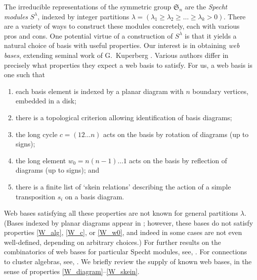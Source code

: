\documentclass[ALCO, Unicode]{cedram}
\numberwithin{equation}{section}
\begin{document}
The irreducible representations of the symmetric group $\mathfrak{S}_n$ are the \emph{Specht modules} $S^\lambda$, indexed by integer partitions $\lambda = (\lambda_1 \geq \lambda_2 \geq \dots \geq \lambda_k > 0)$. There are a variety of ways to construct these modules concretely, each with various pros and cons. One potential virtue of a construction of $S^\lambda$ is that it yields a natural choice of basis with useful properties. Our interest is in obtaining \emph{web bases}, extending seminal work of G.~Kuperberg \cite{Kuperberg}. Various authors differ in precisely what properties they expect a web basis to satisfy. For us, a web basis is one such that 
\begin{enumerate}[label=\textrm{(W.\arabic*)}]
    \item each basis element is indexed by a planar diagram with $n$ boundary vertices, embedded in a disk;\label{W_diagram}
    \item there is a topological criterion allowing identification of basis diagrams; \label{W_alg}
    \item the long cycle $c = (12\ldots n)$ acts on the basis by rotation of diagrams (up to signs); \label{W_c}
    \item \label{W_w0} the long element $w_0 = n(n-1) \ldots 1$ acts on the basis by reflection of diagrams (up to signs); and 
    \item there is a finite list of `skein relations' describing the action of a simple transposition $s_i$ on a basis diagram. \label{W_skein}
\end{enumerate}
Web bases satisfying all these properties are not known for general partitions $\lambda$. (Bases indexed by planar diagrams appear in \cite{Fontaine,Westbury,Elias}; however, these bases do not satisfy properties \ref{W_alg}, \ref{W_c}, or \ref{W_w0}, and indeed in some cases are not even well-defined, depending on arbitrary choices.) For further results on the combinatorics of web bases for particular Specht modules, see, \eg \cite{Russell.Tymoczko:sl2, Rhoades:polytabloid,Russell.Tymoczko:sl3,Im.Zhu,Hwang.Jang.Oh,Purbhoo.Wu}. For connections to cluster algebras, see, \eg \cite{Fomin.Pylyavskyy,Fraser.Pylyavskyy}. We briefly review the supply of known web bases, in the sense of properties \ref{W_diagram}--\ref{W_skein}.
\end{document}
